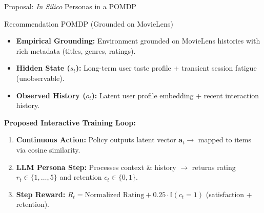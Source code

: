 \documentclass[handout]{beamer}
\begin{document}
\begin{frame}{Proposal: \textit{In Silico} Personas in a POMDP}
  \begin{block}{Recommendation POMDP (Grounded on MovieLens)}
    \small
    \begin{itemize}
      \item \textbf{Empirical Grounding:} Environment grounded on MovieLens histories with rich metadata (titles, genres, ratings).
      \item \textbf{Hidden State ($s_t$):} Long-term user taste profile + transient session fatigue (unobservable).
      \item \textbf{Observed History ($o_t$):} Latent user profile embedding + recent interaction history.
    \end{itemize}
  \end{block}

  \pause
  \vspace{-0.15cm}

  {\textbf{\textcolor{PomonaNavy}{Proposed Interactive Training Loop:}}}
  \small
  \begin{enumerate}
    \item \textbf{Continuous Action:} Policy outputs latent vector $\bm{a}_t \to$ mapped to items via cosine similarity.
    \item \textbf{LLM Persona Step:} Processes context \& history $\to$ returns rating $r_t \in \{1,\dots,5\}$ and retention $c_t \in \{0, 1\}$.
    \item \textbf{Step Reward:} $R_t = \text{Normalized Rating} + 0.25 \cdot \mathbb{I}(c_t = 1)$ (satisfaction + retention).
  \end{enumerate}
\end{frame}
\end{document}

